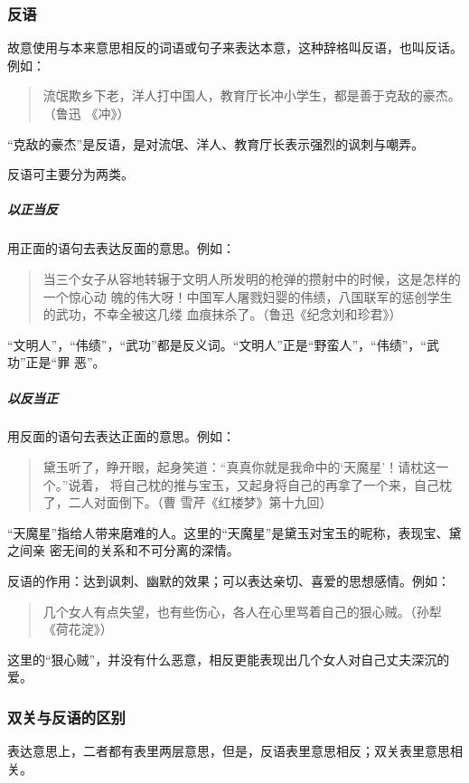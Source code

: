 \documentclass[final,oneside]{ctexbook}
\newenvironment{equotation}{\begin{quotation}\kaishu}{\end{quotation}}
\begin{document}
\subsubsection{反语}

故意使用与本来意思相反的词语或句子来表达本意，这种辞格叫反语，也叫反话。例如：

\begin{equotation}
  流氓欺乡下老，洋人打中国人，教育厅长冲小学生，都是善于克敌的豪杰。（鲁迅
  《冲》）
\end{equotation}
“克敌的豪杰”是反语，是对流氓、洋人、教育厅长表示强烈的讽刺与嘲弄。

反语可主要分为两类。

\subparagraph{以正当反}用正面的语句去表达反面的意思。例如：

\begin{equotation}
  当三个女子从容地转辗于文明人所发明的枪弹的攒射中的时候，这是怎样的一个惊心动
  魄的伟大呀！中国军人屠戮妇婴的伟绩，八国联军的惩创学生的武功，不幸全被这几缕
  血痕抹杀了。（鲁迅《纪念刘和珍君》）
\end{equotation}
“文明人”，“伟绩”，“武功”都是反义词。“文明人”正是“野蛮人”，“伟绩”，“武功”正是“罪
恶”。

\subparagraph{以反当正}用反面的语句去表达正面的意思。例如：

\begin{equotation}
  黛玉听了，睁开眼，起身笑道：“真真你就是我命中的‘天魔星’！请枕这一个。”说着，
  将自己枕的推与宝玉，又起身将自己的再拿了一个来，自己枕了，二人对面倒下。（曹
  雪芹《红楼梦》第十九回）
\end{equotation}
“天魔星”指给人带来磨难的人。这里的“天魔星”是黛玉对宝玉的昵称，表现宝、黛之间亲
密无间的关系和不可分离的深情。

反语的作用：达到讽刺、幽默的效果；可以表达亲切、喜爱的思想感情。例如：

\begin{equotation}
  几个女人有点失望，也有些伤心，各人在心里骂着自己的狠心贼。（孙犁《荷花淀》）
\end{equotation}
这里的“狠心贼”，并没有什么恶意，相反更能表现出几个女人对自己丈夫深沉的爱。

\subsubsection{双关与反语的区别}

表达意思上，二者都有表里两层意思，但是，反语表里意思相反；双关表里意思相关。
\end{document}
